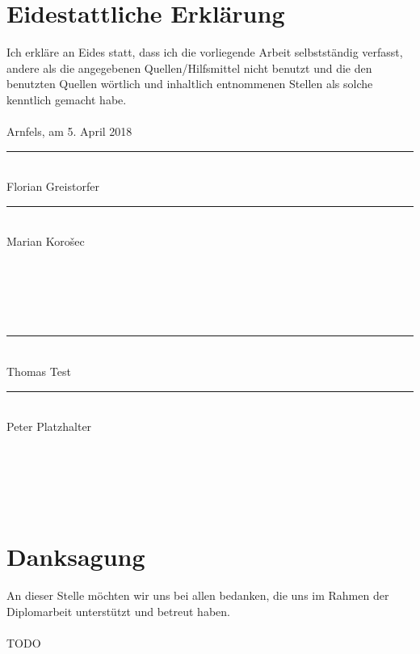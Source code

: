 \frontmatter												%
\addtocounter{page}{2}

\rehead{}
\ohead[\pagemark]{\pagemark}

\newcommand{\doublesignature}[2]{%
  \parbox{\textwidth}{
    \hfill
    \parbox{7cm}{
      \centering
      \rule{6cm}{1pt}\\
      #1
    }
    \parbox{7cm}{
      \centering
      \rule{6cm}{1pt}\\
      #2
    }
  }
  \mbox{}\\
  \mbox{}\\
  \mbox{}\\
  \mbox{}\\
}

\vspace*{20pt}

\section*{Eidestattliche Erklärung}
\label{sec:eidestattliche-erklaerung}
Ich erkläre an Eides statt, dass ich die vorliegende Arbeit selbstständig verfasst, andere als die angegebenen
Quellen/Hilfsmittel nicht benutzt und die den benutzten Quellen wörtlich und inhaltlich entnommenen
Stellen als solche kenntlich gemacht habe.\\
\\
Arnfels, am 5. April 2018\\

\vskip 1cm

\doublesignature{Florian Greistorfer}{Marian Korošec}
\doublesignature{Thomas Test}{Peter Platzhalter}

\vskip 5cm

\clearpage

\newpage
\thispagestyle{empty}
\mbox{}

\clearpage

\section*{Danksagung}
\label{sec:danksagung}
An dieser Stelle möchten wir uns bei allen bedanken, die uns im Rahmen der Diplomarbeit unterstützt und betreut haben.\\
\\
TODO

\clearpage

\newpage
\thispagestyle{empty}
\mbox{}

\clearpage

